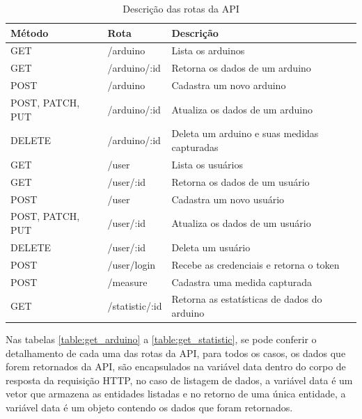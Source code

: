 \begin{table}[H]
    \centering
    \caption{Descrição das rotas da API}
    \label{table:table_api_routes}
    \begin{tabularx}{\textwidth}{l|l|l}
    \hline
    \textbf{Método}  & \textbf{Rota}        & \textbf{Descrição}                           \\ \hline
    GET              & /arduino             & Lista os arduinos                            \\ \hline
    GET              & /arduino/:id         & Retorna os dados de um arduino               \\ \hline
    POST             & /arduino             & Cadastra um novo arduino                     \\ \hline
    POST, PATCH, PUT & /arduino/:id         & Atualiza os dados de um arduino              \\ \hline
    DELETE           & /arduino/:id         & Deleta um arduino e suas medidas capturadas  \\ \hline
    GET              & /user                & Lista os usuários                            \\ \hline
    GET              & /user/:id            & Retorna os dados de um usuário               \\ \hline
    POST             & /user                & Cadastra um novo usuário                     \\ \hline
    POST, PATCH, PUT & /user/:id            & Atualiza os dados de um usuário              \\ \hline
    DELETE           & /user/:id            & Deleta um usuário                            \\ \hline
    POST             & /user/login          & Recebe as credenciais e retorna o token      \\ \hline
    POST             & /measure             & Cadastra uma medida capturada                \\ \hline
    GET              & /statistic/:id       & Retorna as estatísticas de dados do arduino  \\ \hline
    \end{tabularx}
\end{table}

Nas tabelas \ref{table:get_arduino} a \ref{table:get_statistic}, se pode conferir o detalhamento de cada uma das rotas da API, para todos os casos, os dados que forem retornados da API, são encapsulados na variável data dentro do corpo de resposta da requisição HTTP, no caso de listagem de dados, a variável data é um vetor que armazena as entidades listadas e no retorno de uma única entidade, a variável data é um objeto contendo os dados que foram retornados.

